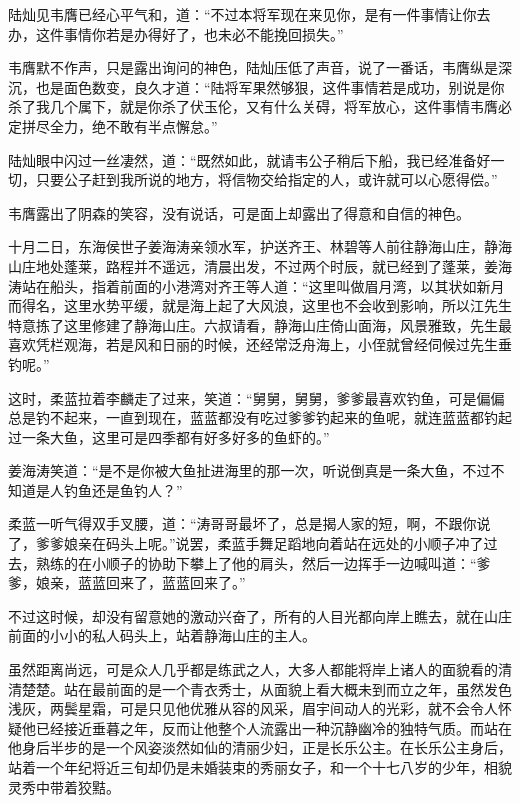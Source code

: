 陆灿见韦膺已经心平气和，道：“不过本将军现在来见你，是有一件事情让你去办，这件事情你若是办得好了，也未必不能挽回损失。”

韦膺默不作声，只是露出询问的神色，陆灿压低了声音，说了一番话，韦膺纵是深沉，也是面色数变，良久才道：“陆将军果然够狠，这件事情若是成功，别说是你杀了我几个属下，就是你杀了伏玉伦，又有什么关碍，将军放心，这件事情韦膺必定拼尽全力，绝不敢有半点懈怠。”

陆灿眼中闪过一丝凄然，道：“既然如此，就请韦公子稍后下船，我已经准备好一切，只要公子赶到我所说的地方，将信物交给指定的人，或许就可以心愿得偿。”

韦膺露出了阴森的笑容，没有说话，可是面上却露出了得意和自信的神色。

十月二日，东海侯世子姜海涛亲领水军，护送齐王、林碧等人前往静海山庄，静海山庄地处蓬莱，路程并不遥远，清晨出发，不过两个时辰，就已经到了蓬莱，姜海涛站在船头，指着前面的小港湾对齐王等人道：“这里叫做眉月湾，以其状如新月而得名，这里水势平缓，就是海上起了大风浪，这里也不会收到影响，所以江先生特意拣了这里修建了静海山庄。六叔请看，静海山庄倚山面海，风景雅致，先生最喜欢凭栏观海，若是风和日丽的时候，还经常泛舟海上，小侄就曾经伺候过先生垂钓呢。”

这时，柔蓝拉着李麟走了过来，笑道：“舅舅，舅舅，爹爹最喜欢钓鱼，可是偏偏总是钓不起来，一直到现在，蓝蓝都没有吃过爹爹钓起来的鱼呢，就连蓝蓝都钓起过一条大鱼，这里可是四季都有好多好多的鱼虾的。”

姜海涛笑道：“是不是你被大鱼扯进海里的那一次，听说倒真是一条大鱼，不过不知道是人钓鱼还是鱼钓人？”

柔蓝一听气得双手叉腰，道：“涛哥哥最坏了，总是揭人家的短，啊，不跟你说了，爹爹娘亲在码头上呢。”说罢，柔蓝手舞足蹈地向着站在远处的小顺子冲了过去，熟练的在小顺子的协助下攀上了他的肩头，然后一边挥手一边喊叫道：“爹爹，娘亲，蓝蓝回来了，蓝蓝回来了。”

不过这时候，却没有留意她的激动兴奋了，所有的人目光都向岸上瞧去，就在山庄前面的小小的私人码头上，站着静海山庄的主人。

虽然距离尚远，可是众人几乎都是练武之人，大多人都能将岸上诸人的面貌看的清清楚楚。站在最前面的是一个青衣秀士，从面貌上看大概未到而立之年，虽然发色浅灰，两鬓星霜，可是只见他优雅从容的风采，眉宇间动人的光彩，就不会令人怀疑他已经接近垂暮之年，反而让他整个人流露出一种沉静幽冷的独特气质。而站在他身后半步的是一个风姿淡然如仙的清丽少妇，正是长乐公主。在长乐公主身后，站着一个年纪将近三旬却仍是未婚装束的秀丽女子，和一个十七八岁的少年，相貌灵秀中带着狡黠。

